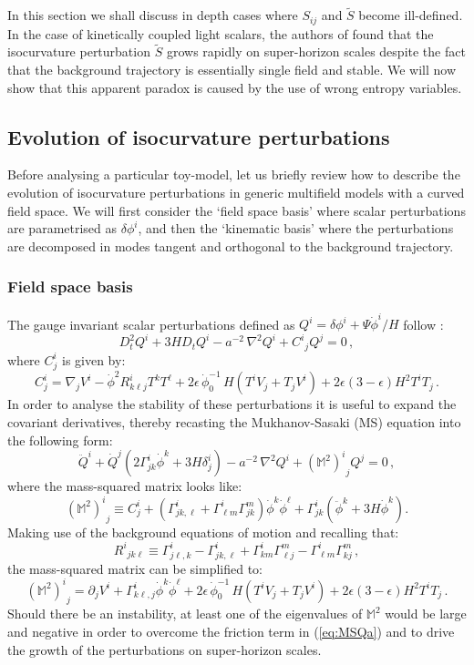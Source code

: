 \documentclass[a4paper,11pt]{article}
\def\be{\begin{equation}}
\def\ee{\end{equation}}
\begin{document}
In this section we shall discuss in depth cases where $S_{ij}$ and $\tilde S$ become ill-defined. In the case of kinetically coupled light scalars, the authors of \cite{Cicoli:2019ulk,Cicoli:2018ccr} found that the isocurvature perturbation $\tilde S$ grows rapidly on super-horizon scales despite the fact that the background trajectory is essentially single field and stable. We will now show that this apparent paradox is caused by the use of wrong entropy variables. 

\subsection{Evolution of isocurvature perturbations}

Before analysing a particular toy-model, let us briefly review how to describe the evolution of isocurvature perturbations in generic multifield models with a curved field space. We will first consider the `field space basis' where scalar perturbations are parametrised as $\delta \phi^i$, and then the `kinematic basis' where the perturbations are decomposed in modes tangent and orthogonal to the background trajectory. 

\subsubsection*{Field space basis}

The gauge invariant scalar perturbations defined as $Q^i=\delta\phi^i + \Psi \dot{\phi}^i/H$ follow \cite{Sasaki:1995aw}:
\be
D_t^2 Q^i+3H D_t Q^i-a^{-2}\,\nabla^2 Q^i+{C^i}_j Q^j=0 \,,
\label{eq:SasakiStewart}
\ee
where $C^i_j$ is given by:
\be
C^i_j=\nabla_j V^i-\dot{\phi}^2 R^i_{k\ell j} T^k T^\ell +2 \epsilon\,\dot\phi_0^{-1}\,H\left(T^i V_j+T_j V^i\right)+2\epsilon(3-\epsilon)H^2 T^i T_j\,.
\ee
In order to analyse the stability of these perturbations it is useful to expand the covariant derivatives, thereby recasting the Mukhanov-Sasaki (MS) equation into the following form:
\be
\ddot{Q}^i+\dot{Q}^j \left(2\Gamma^i_{jk}\dot{\phi}^k+3 H \delta^i_j\right)-a^{-2}\,\nabla^2 Q^i+{ (\mathbb{M}^2)^i}_j Q^j=0\,,
\label{eq:MSQa}
\ee
where the mass-squared matrix looks like:
\be
{(\mathbb{M}^2)^i}_j\equiv C^i_j+\left(\Gamma^i_{jk,\ell}+\Gamma^i_{\ell m}\Gamma^m_{jk}\right)\dot{\phi}^k\dot{\phi}^\ell+\Gamma^i_{jk}\left(\ddot{\phi}^k+3 H\dot{\phi}^k\right).
\ee
Making use of the background equations of motion and recalling that:
\be
{R^i}_{jk\ell}\equiv \Gamma^i_{j\ell,k}-\Gamma^i_{jk,\ell}+\Gamma^i_{km}\Gamma^m_{\ell j}-\Gamma^i_{\ell m}\Gamma^m_{kj}\,,
\ee
the mass-squared matrix can be simplified to:
\be
{(\mathbb{M}^2)^i}_j=\partial_j V^i+\Gamma^i_{k\ell,j}\dot{\phi}^k\dot{\phi}^\ell+2\epsilon\,\dot\phi_0^{-1}\,H\left(T^i V_j+T_j V^i\right)+2\epsilon(3-\epsilon) H^2 T^i T_j\,.
\label{Msqfb}
\ee
Should there be an instability, at least one of the eigenvalues of $\mathbb{M}^2$ would be large and negative in order to overcome the friction term in (\ref{eq:MSQa}) and to drive the growth of the perturbations on super-horizon scales.
 
\end{document}

